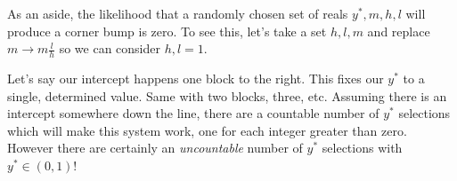 \documentclass[11pt, oneside]{article} 	%
\begin{document}
As an aside, the likelihood that a randomly chosen set of reals $y^*, m, h, l$ will produce a corner bump is zero.   To see this, let's take a set $h, l, m$ and replace $m \rightarrow m \frac{l}{h}$ so we can consider $h, l = 1$.  

Let's say our intercept happens one block to the right.  This fixes our $y^*$ to a single, determined value.  Same with two blocks, three, etc.  Assuming there is an intercept somewhere down the line, there are a countable number of $y^*$ selections which will make this system work, one for each integer greater than zero.  However there are certainly an \emph{uncountable} number of $y^*$ selections with $y^* \in (0, 1)$!
\end{document}
